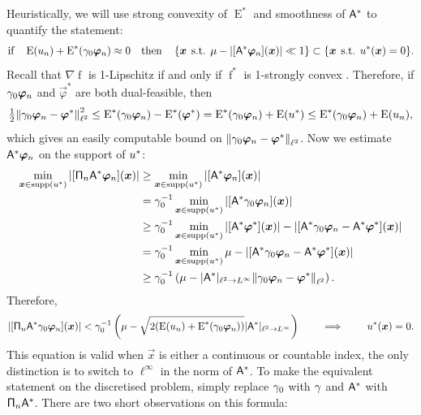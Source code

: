 \documentclass[smallextended]{svjour3}
\newcommand{\norm}[1]{{\left\lVert #1 \right\rVert}}
\newcommand{\op}[1]{\operatorname{#1}}
\newcommand{\1}{\F{1}}
\DeclareMathOperator{\st}{\;s.t.\;}
\DeclareMathOperator{\supp}{supp}
\newcommand*{\var}[1]{%
	\IfEqCase{#1}{%
		{0}{u}%
		{1}{v}%
		{2}{w}%
	}[u#1]%
}
\newcommand*{\vars}[1]{%
	\IfEqCase{#1}{%
		{0}{\alpha}%
		{1}{\beta}%
		{2}{\gamma}%
		{3}{a}%
		{4}{b}%
		{5}{c}%
	}[k#1]%
}
\begin{document}
	Heuristically, we will use strong convexity of $\op{E}^*$ and smoothness of $\mathsf{A}^*$ to quantify the statement:
	$$ \text{if}\quad \op{E}(\var0_n) + \op{E}^*(\vars2_0 \vec{\varphi}_n) \approx 0 \quad \text{then}\quad \left\{\vec{x}\st \mu - |[\A^*\vec{\varphi}_n](\vec{x})|\ll 1\right\} \subset\{\vec{x} \st \var0^*(\vec{x})=0\}.$$
	Recall that $\nabla\op{f}$ is 1-Lipschitz if and only if $\op{f}^*$ is 1-strongly convex \cite[Chapter 10, Thm. 4.2.2]{Hiriart2013}. Therefore, if $\vars2_0\vec{\varphi}_n$ and $\vec{\varphi}^*$ are both dual-feasible, then
	\begin{equation}
		\tfrac12\norm{\vars2_0\vec{\varphi}_n-\vec{\varphi}^*}_{\ell^2}^2 \leq \op{E}^*(\vars2_0\vec{\varphi}_n) - \op{E}^*(\vec{\varphi}^*) = \op{E}^*(\vars2_0\vec{\varphi}_n) + \op{E}(\var0^*) \leq \op{E}^*(\vars2_0\vec{\varphi}_n) + \op{E}(\var0_n),
	\end{equation}
	which gives an easily computable bound on $\norm{\vars2_0\vec{\varphi}_n-\vec{\varphi}^*}_{\ell^2}$. Now we estimate $\A^*\vec{\varphi}_n$ on the support of $\var0^*$:
	\begin{align}
		\min_{\vec{x}\in\supp(\var0^*)} |[\tens{\Pi}_n\A^*\vec{\varphi}_n](\vec{x})| &\geq \min_{\vec{x}\in\supp(\var0^*)} |[\A^*\vec{\varphi}_n](\vec{x})|
		\\&= \vars2_0^{-1}\min_{\vec{x}\in\supp(\var0^*)} |[\A^*\vars2_0 \vec{\varphi}_n](\vec{x})|
		\\&\geq \vars2_0^{-1}\min_{\vec{x}\in\supp(\var0^*)} |[\A^*\vec{\varphi}^*](\vec{x})| - |[\A^*\vars2_0 \vec{\varphi}_n-\A^*\vec{\varphi}^*](\vec{x})|
		\\&= \vars2_0^{-1}\min_{\vec{x}\in\supp(\var0^*)} \mu - |[\A^*\vars2_0 \vec{\varphi}_n-\A^*\vec{\varphi}^*](\vec{x})|
		\\&\geq \vars2_0^{-1}\left(\mu - |\A^*|_{\ell^2\to L^\infty}\norm{\vars2_0 \vec{\varphi}_n-\vec{\varphi}^*}_{\ell^2}\right).
	\end{align}
	Therefore,
	\begin{equation}
		|[\tens{\Pi}_n\A^*\vars2_0\vec{\varphi}_n](\vec{x})|< \vars2_0^{-1}\left(\mu - \sqrt{2(\op{E}(\var0_n)+\op{E}^*(\vars2_0\vec{\varphi}_n))}|\A^*|_{\ell^2\to L^\infty}\right) \qquad \implies \qquad \var0^*(\vec{x})= 0.\label{eq: support equation}
	\end{equation}
	This equation is valid when $\vec{x}$ is either a continuous or countable index, the only distinction is to switch to $\ell^\infty$ in the norm of $\mathsf{A}^*$. To make the equivalent statement on the discretised problem, simply replace $\vars2_0$ with $\vars2$ and $\mathsf{A}^*$ with $\mathsf{\Pi}_n\mathsf{A}^*$. There are two short observations on this formula:
\end{document}
